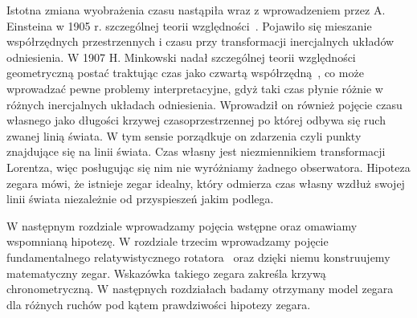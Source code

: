 Istotna zmiana wyobrażenia czasu nastąpiła wraz z wprowadzeniem przez 
A. Einsteina w 1905 r. szczególnej teorii względności~\cite{einstein}.
Pojawiło się mieszanie współrzędnych 
przestrzennych i czasu przy transformacji 
inercjalnych układów odniesienia. 
W 1907 H. Minkowski nadał szczególnej teorii względności 
geometryczną postać traktując czas jako czwartą 
współrzędną~\cite{minkowski2013space}, co może 
wprowadzać pewne problemy interpretacyjne, gdyż taki 
czas płynie różnie w różnych inercjalnych 
układach odniesienia.
Wprowadził on również pojęcie czasu własnego jako długości 
krzywej czasoprzestrzennej po której odbywa się ruch zwanej linią świata.
W tym sensie porządkuje on zdarzenia czyli punkty znajdujące
się na linii świata.
Czas własny jest niezmiennikiem transformacji Lorentza, 
więc posługując się
nim nie wyróżniamy żadnego obserwatora.
Hipoteza zegara
mówi, że istnieje zegar idealny, który odmierza czas własny 
wzdłuż swojej linii świata niezależnie od przyspieszeń 
jakim podlega.

W następnym rozdziale wprowadzamy pojęcia wstępne oraz omawiamy 
wspomnianą hipotezę. W rozdziale trzecim wprowadzamy pojęcie 
fundamentalnego relatywistycznego rotatora~\cite{star2008} oraz 
dzięki niemu konstruujemy matematyczny zegar. 
Wskazówka takiego zegara zakreśla krzywą chronometryczną.
W następnych rozdziałach badamy otrzymany model zegara
dla różnych ruchów pod kątem prawdziwości hipotezy zegara.
